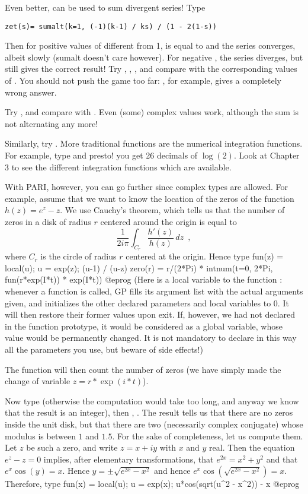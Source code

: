 Even better,  can be used to sum divergent series! Type

\centerline{\tt zet(s)= sumalt(k=1, (-1)\pow(k-1) / k\pow s) / (1 - 2\pow(1-s))}

Then for positive values of  different from 1,  is equal
to  and the series converges, albeit slowly (sumalt doesn't
care however). For negative , the series diverges, but 
still gives the correct result! Try , ,
, and compare with the corresponding values of .
You should not push the game too far: , for example,
gives a completely wrong answer.

Try , and compare with . Even (some) complex values
work, although the sum is not alternating any more!

Similarly, try .
\medskip
%
More traditional functions are the numerical integration functions.
For example, type  and presto! you get 26 decimals
of $\log(2)$. Look at Chapter 3 to see the different integration functions
which are available.

With PARI, however, you can go further since complex types are allowed.
For example, assume that we want to know the location of the zeros of the
function $h(z)=e^z-z$. We use Cauchy's theorem, which tells us that the
number of zeros in a disk of radius $r$ centered around the origin is
equal to
$$\dfrac{1}{2i\pi}\int_{C_r}\dfrac{h'(z)}{h(z)}\,dz\enspace,$$
where $C_r$ is the circle of radius $r$ centered at the origin.
Hence type
\bprog
fun(z) =
{
  local(u);
  u = exp(z);
  (u-1) / (u-z)
}
zero(r) = r/(2*Pi) * intnum(t=0, 2*Pi, fun(r*exp(I*t)) * exp(I*t))
@eprog
\noindent (Here  is a local variable to the function : whenever
a function is called, GP fills its argument list with the actual arguments
given, and initializes the other declared parameters and local variables to
0. It will then restore their former values upon exit. If, however, we had
not declared  in the function prototype, it would be considered as a
global variable, whose value would be permanently changed. It is not
mandatory to declare in this way all the parameters you use, but beware of
side effects!)

The function  will then count the number of zeros (we have simply
made the change of variable $z = r*\exp(i*t)$).

Now type  (otherwise the computation would take too long, and
anyway we know that the result is an integer), then , .
The result tells us that there are no zeros inside the unit disk, but that
there are two (necessarily complex conjugate) whose modulus is between $1$
and $1.5$. For the sake of completeness, let us compute them. Let $z$ be such
a zero, and write $z=x+iy$ with $x$ and $y$ real. Then the equation $e^z-z=0$
implies, after elementary transformations, that $e^{2x}=x^2+y^2$ and that
$e^x\cos(y)=x$. Hence $y=\pm\sqrt{e^{2x}-x^2}$ and hence
$e^x\cos(\sqrt{e^{2x}-x^2})=x$. Therefore, type
\bprog
fun(x) =
{
  local(u);
  u = exp(x);
  u*cos(sqrt(u^2 - x^2)) - x
}
@eprog

